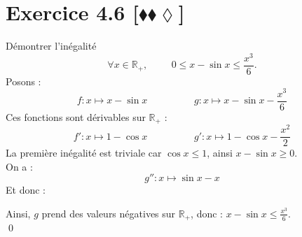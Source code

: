 \documentclass[10pt]{article}
\begin{document}
\section*{Exercice 4.6 [$\blacklozenge\blacklozenge\lozenge$]}
\begin{tcolorbox}[enhanced, width=7in, center, size=fbox, fontupper=\large, drop shadow southwest]
    Démontrer l'inégalité
    \begin{equation*}
        \forall{x\in\mathbb{R}_+}, \hspace{1cm} 0\leq x-\sin x\leq\frac{x^3}{6}.
    \end{equation*}
    Posons :
    \begin{equation*}
        f:x\mapsto x-\sin x \hspace{2cm} g:x\mapsto x-\sin x - \frac{x^3}{6}
    \end{equation*}
    Ces fonctions sont dérivables sur $\mathbb{R}_+$ :
    \begin{equation*}
        f':x\mapsto 1-\cos x \hspace {2cm} g':x\mapsto 1-\cos x - \frac{x^2}{2}
    \end{equation*}
    La première inégalité est triviale car $\cos x\leq1$, ainsi $x-\sin x\geq 0$.\\
    On a :
    \begin{equation*}
        g'':x\mapsto\sin x - x
    \end{equation*}
    Et donc :
    \begin{center}
    \end{center}
    Ainsi, $g$ prend des valeurs négatives sur $\mathbb{R}_+$, donc : $x-\sin x\leq\frac{x^3}{6}$.\\
    \qed
\end{tcolorbox}
\end{document}

